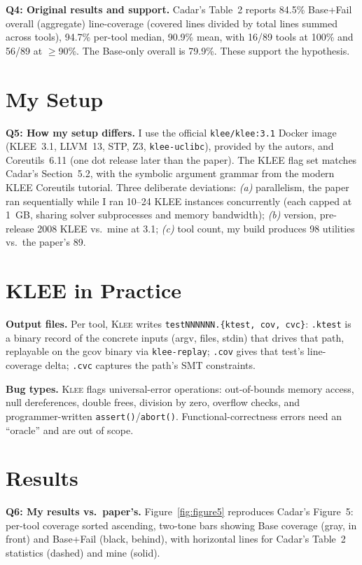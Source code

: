 \documentclass[sigconf,nonacm,10pt]{acmart}
\newcommand{\Q}[2]{\textbf{Q#1: #2.}\;}
\begin{document}
\Q{4}{Original results and support} Cadar's Table~2 reports 84.5\% Base+Fail
overall (aggregate) line-coverage (covered lines divided by total lines
summed across tools), 94.7\% per-tool median, 90.9\% mean, with
16/89 tools at 100\% and 56/89 at $\geq$90\%. The Base-only
overall is 79.9\%. These support the hypothesis.

\section{My Setup}

\Q{5}{How my setup differs} I use the official
\texttt{klee/klee:3.1} Docker image (KLEE~3.1, LLVM~13, STP, Z3,
\texttt{klee-uclibc}), provided by the autors, and Coreutils~6.11 (one
dot release later than the paper). The KLEE flag set matches
Cadar's Section~5.2, with the symbolic argument grammar from
the modern KLEE Coreutils tutorial. Three deliberate deviations:
\emph{(a)} parallelism, the paper ran sequentially while I ran
10--24 KLEE instances concurrently (each
capped at 1~GB, sharing solver subprocesses and memory bandwidth);
\emph{(b)} version, pre-release 2008 KLEE vs.\ mine at 3.1;
\emph{(c)} tool count, my build produces 98 utilities vs.\ the
paper's 89.

\section{KLEE in Practice}

\textbf{Output files.} Per tool, \textsc{Klee} writes
\texttt{testNNNNNN.\{ktest, cov, cvc\}}: \texttt{.ktest} is a
binary record of the concrete inputs (argv, files, stdin) that
drives that path, replayable on the gcov binary via
\texttt{klee-replay}; \texttt{.cov} gives that test's
line-coverage delta; \texttt{.cvc} captures the path's SMT
constraints.

\textbf{Bug types.} \textsc{Klee} flags universal-error
operations: out-of-bounds memory access, null dereferences, double
frees, division by zero, overflow checks, and programmer-written
\texttt{assert()}/\texttt{abort()}. Functional-correctness errors
need an ``oracle'' and are out of scope.

\section{Results}

\Q{6}{My results vs.\ paper's} Figure~\ref{fig:figure5} reproduces
Cadar's Figure~5: per-tool coverage sorted ascending,
two-tone bars showing Base coverage (gray, in front) and Base+Fail
(black, behind), with horizontal lines for Cadar's Table~2
statistics (dashed) and mine (solid).
\end{document}
